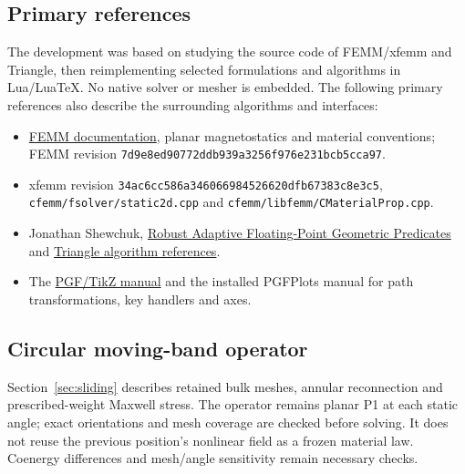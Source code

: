 \subsection{Primary references}
The development was based on studying the source code of FEMM/xfemm
and Triangle, then reimplementing selected formulations and algorithms
in Lua/LuaTeX. No native solver or mesher is embedded. The following primary references
also describe the surrounding algorithms and interfaces:
\begin{itemize}
\item \href{https://www.femm.info/wiki/Documentation}{FEMM documentation},
  planar magnetostatics and material conventions; FEMM revision
  \nolinkurl{7d9e8ed90772ddb939a3256f976e231bcb5cca97}.
\item xfemm revision \nolinkurl{34ac6cc586a346066984526620dfb67383c8e3c5},
  \nolinkurl{cfemm/fsolver/static2d.cpp} and
  \nolinkurl{cfemm/libfemm/CMaterialProp.cpp}.
\item Jonathan Shewchuk,
  \href{https://www.cs.cmu.edu/~quake/robust.html}{Robust Adaptive Floating-Point Geometric Predicates}
  and \href{https://www.cs.cmu.edu/~quake/triangle.research.html}{Triangle algorithm references}.
\item The \href{https://tikz.dev}{PGF/TikZ manual} and the installed
  PGFPlots manual for path transformations, key handlers and axes.
\end{itemize}

\subsection{Circular moving-band operator}
Section~\ref{sec:sliding} describes retained bulk meshes, annular reconnection
and prescribed-weight Maxwell stress. The operator remains planar P1 at each
static angle; exact orientations and mesh coverage are checked before solving.
It does not reuse the previous position's nonlinear field as a frozen material
law. Coenergy differences and mesh/angle sensitivity remain necessary checks.
